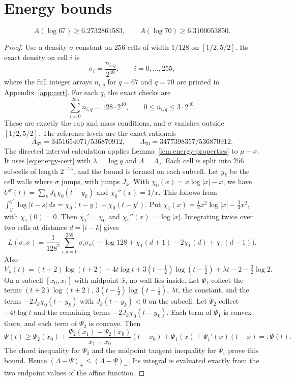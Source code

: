 \section{Energy bounds}\label{sec:energy}

\begin{proposition}\label{prop:energy}
\[
 A(\log 67)\ge 6.2732861583,
 \qquad
 A(\log 70)\ge 6.3100053850.
\]
\end{proposition}

\begin{proof}
Use a density \(\sigma\) constant on 256 cells of width \(1/128\) on \([1/2,5/2]\). Its exact density on cell \(i\) is
\[
 \sigma_i=\frac{n_{i,q}}{2^{40}},\qquad i=0,\ldots,255,
\]
where the full integer arrays \(n_{i,q}\) for \(q=67\) and \(q=70\) are printed in Appendix~\ref{app:cert}. For each \(q\), the exact checks are
\[
 \sum_{i=0}^{255} n_{i,q}=128\cdot2^{40},\qquad 0\le n_{i,q}\le3\cdot2^{40}.
\]
These are exactly the cap and mass conditions, and \(\sigma\) vanishes outside \([1/2,5/2]\). The reference levels are the exact rationals
\[
 \Lambda_{67}=3451654071/536870912,
 \qquad
 \Lambda_{70}=3477398357/536870912.
\]
The directed interval calculation applies Lemma~\ref{lem:energy-properties} to \(\mu-\sigma\). It uses \eqref{eq:energy-cert} with \(\lambda=\log q\) and \(\Lambda=\Lambda_q\). Each cell is split into \(256\) subcells of length \(2^{-15}\), and the bound is formed on each subcell. Let \(y_k\) be the cell walls where \(\sigma\) jumps, with jumps \(J_k\). With \(\chi_0(x)=x\log|x|-x\), we have \(U^\sigma(t)=\sum_k J_k\chi_0(t-y_k)\) and \(\chi_0''(x)=1/x\). This follows from \(\int_y^{y'}\log|t-s|\,ds=\chi_0(t-y)-\chi_0(t-y')\). Put \(\chi_1(x)=\frac12x^2\log|x|-\frac34x^2\), with \(\chi_1(0)=0\). Then \(\chi_1'=\chi_0\) and \(\chi_1''(x)=\log|x|\). Integrating twice over two cells at distance \(d=|i-k|\) gives
\[
 L(\sigma,\sigma)=\frac1{128^2}\sum_{i,k=0}^{255}\sigma_i\sigma_k
 \bigl(-\log128+\chi_1(d+1)-2\chi_1(d)+\chi_1(d-1)\bigr).
\] Also
\[
 V_\lambda(t)=(t+2)\log(t+2)-4t\log t+3(t-\tfrac12)\log(t-\tfrac12)+\lambda t-2-\tfrac32\log2 .
\]
On a subcell \([x_0,x_1]\) with midpoint \(\bar x\), no wall lies inside. Let \(\Psi_1\) collect the terms \((t+2)\log(t+2)\), \(3(t-\frac12)\log(t-\frac12)\), \(\lambda t\), the constant, and the terms \(-2J_k\chi_0(t-y_k)\) with \(J_k(t-y_k)<0\) on the subcell. Let \(\Psi_2\) collect \(-4t\log t\) and the remaining terms \(-2J_k\chi_0(t-y_k)\). Each term of \(\Psi_1\) is convex there, and each term of \(\Psi_2\) is concave. Then
\[
 \Psi(t)\ge \Psi_2(x_0)+\frac{\Psi_2(x_1)-\Psi_2(x_0)}{x_1-x_0}(t-x_0)+\Psi_1(\bar x)+\Psi_1'(\bar x)(t-\bar x)=:\underline \Psi(t).
\]
The chord inequality for \(\Psi_2\) and the midpoint tangent inequality for \(\Psi_1\) prove this bound. Hence \((\Lambda-\Psi)_+\le(\Lambda-\underline \Psi)_+\). Its integral is evaluated exactly from the two endpoint values of the affine function.


\end{proof}
